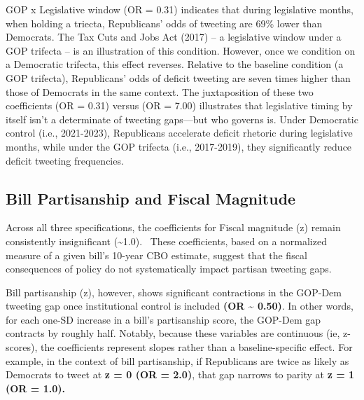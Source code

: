 \documentclass[
]{article}
\begin{document}
GOP x Legislative window (OR = 0.31) indicates that during legislative
months, when holding a triecta, Republicans' odds of tweeting are 69\%
lower than Democrats. The Tax Cuts and Jobs Act (2017) -- a legislative
window under a GOP trifecta -- is an illustration of this condition.
However, once we condition on a Democratic trifecta, this effect
reverses. Relative to the baseline condition (a GOP trifecta),
Republicans' odds of deficit tweeting are seven times higher than those
of Democrats in the same context. The juxtaposition of these two
coeﬀicients (OR = 0.31) versus (OR = 7.00) illustrates that legislative
timing by itself isn't a determinate of tweeting gaps---but who governs
is. Under Democratic control (i.e., 2021-2023), Republicans accelerate
deficit rhetoric during legislative months, while under the GOP trifecta
(i.e., 2017-2019), they significantly reduce deficit tweeting
frequencies.

\subsection{\texorpdfstring{\textbf{Bill Partisanship and Fiscal
Magnitude}}{Bill Partisanship and Fiscal Magnitude}}\label{bill-partisanship-and-fiscal-magnitude}

Across all three specifications, the coefficients for Fiscal magnitude
(z) remain consistently insignificant (\textasciitilde1.0).~ These
coefficients, based on a normalized measure of a given bill's 10-year
CBO estimate, suggest that the fiscal consequences of policy do not
systematically impact partisan tweeting gaps.

Bill partisanship (z), however, shows significant contractions in the
GOP-Dem tweeting gap once institutional control is included \textbf{(OR
\textasciitilde{} 0.50)}. In other words, for each one-SD increase in a
bill's partisanship score, the GOP-Dem gap contracts by roughly half.
Notably, because these variables are continuous (ie, z-scores), the
coefficients represent slopes rather than a baseline-specific effect.
For example, in the context of bill partisanship, if Republicans are
twice as likely as Democrats to tweet at \textbf{z = 0 (OR = 2.0)}, that
gap narrows to parity at \textbf{z = 1 (OR = 1.0).}

\FloatBarrier
\end{document}
